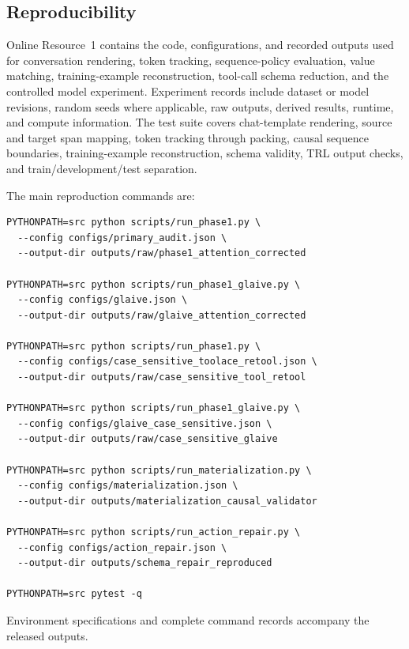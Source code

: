 \documentclass[pdflatex,sn-basic,Numbered]{sn-jnl}
\begin{document}
\begin{appendices}
\setcounter{table}{1}
\setcounter{figure}{3}
\renewcommand{\thetable}{\arabic{table}}
\renewcommand{\thefigure}{\arabic{figure}}
\section{Reproducibility}

Online Resource~1 contains the code, configurations, and recorded outputs used for
conversation rendering, token tracking, sequence-policy evaluation, value matching,
training-example reconstruction, tool-call schema reduction, and the controlled model experiment.
Experiment records include dataset or model revisions, random seeds where applicable, raw outputs,
derived results, runtime, and compute information. The test suite covers chat-template rendering,
source and target span mapping, token tracking through packing, causal sequence boundaries,
training-example reconstruction, schema validity, TRL output checks, and
train/development/test separation.

The main reproduction commands are:

\begin{verbatim}
PYTHONPATH=src python scripts/run_phase1.py \
  --config configs/primary_audit.json \
  --output-dir outputs/raw/phase1_attention_corrected

PYTHONPATH=src python scripts/run_phase1_glaive.py \
  --config configs/glaive.json \
  --output-dir outputs/raw/glaive_attention_corrected

PYTHONPATH=src python scripts/run_phase1.py \
  --config configs/case_sensitive_toolace_retool.json \
  --output-dir outputs/raw/case_sensitive_tool_retool

PYTHONPATH=src python scripts/run_phase1_glaive.py \
  --config configs/glaive_case_sensitive.json \
  --output-dir outputs/raw/case_sensitive_glaive

PYTHONPATH=src python scripts/run_materialization.py \
  --config configs/materialization.json \
  --output-dir outputs/materialization_causal_validator

PYTHONPATH=src python scripts/run_action_repair.py \
  --config configs/action_repair.json \
  --output-dir outputs/schema_repair_reproduced

PYTHONPATH=src pytest -q
\end{verbatim}

Environment specifications and complete command records accompany the released outputs.



\end{appendices}
\end{document}
